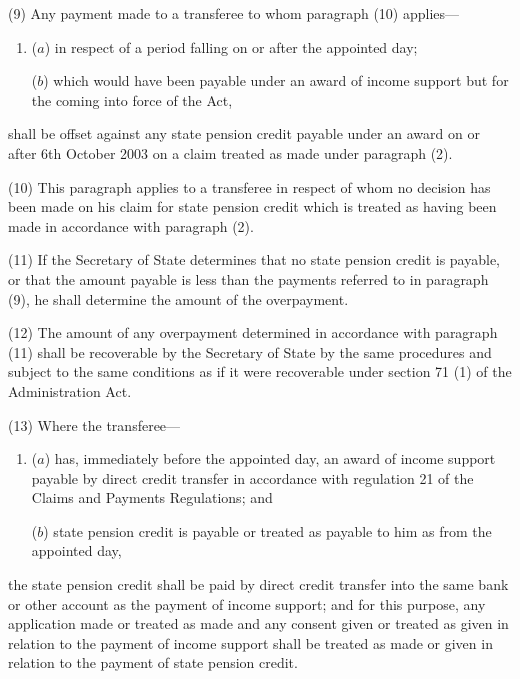 \documentclass[12pt,a4paper]{article}
\begin{document}
(9) Any payment made to a transferee to whom paragraph (10) applies—
\begin{enumerate}\item[]
($a$) in respect of a period falling on or after the appointed day;

($b$) which would have been payable under an award of income support but for the coming into force of the Act,
\end{enumerate}
shall be offset against any state pension credit payable under an award on or after 6th October 2003 on a claim treated as made under paragraph (2).

(10) This paragraph applies to a transferee in respect of whom no decision has been made on his claim for state pension credit which is treated as having been made in accordance with paragraph (2).

(11) If the Secretary of State determines that no state pension credit is payable, or that the amount payable is less than the payments referred to in paragraph (9), he shall determine the amount of the overpayment.

(12) The amount of any overpayment determined in accordance with paragraph (11) shall be recoverable by the Secretary of State by the same procedures and subject to the same conditions as if it were recoverable under section 71 (1) of the Administration Act.

(13) Where the transferee—
\begin{enumerate}\item[]
($a$) has, immediately before the appointed day, an award of income support payable by direct credit transfer in accordance with regulation 21 of the Claims and Payments Regulations; and

($b$) state pension credit is payable or treated as payable to him as from the appointed day,
\end{enumerate}
the state pension credit shall be paid by direct credit transfer into the same bank or other account as the payment of income support; and for this purpose, any application made or treated as made and any consent given or treated as given in relation to the payment of income support shall be treated as made or given in relation to the payment of state pension credit.
\end{document}
